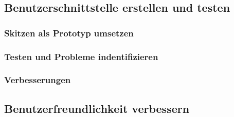 \documentclass[10pt]{article}
\begin{document}
	\subsection{Benutzerschnittstelle erstellen und testen}
	\subsubsection{Skitzen als Prototyp umsetzen}
	\subsubsection{Testen und Probleme indentifizieren}
	\subsubsection{Verbesserungen}
	\subsection{Benutzerfreundlichkeit verbessern}
	
	
	
\end{document}
